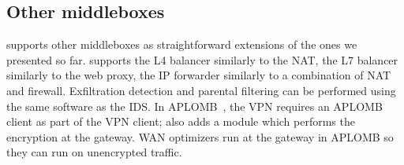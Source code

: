 
\subsection{Other middleboxes}\label{sec:vpn} \label{sec:other_apps} \label{sec:not_supp}\label{sec:loadb}

 \sys supports other middleboxes as straightforward extensions of the ones we presented so far. 
\sys supports the L4 balancer similarly to the NAT, the L7 balancer similarly to the web proxy, the IP forwarder similarly to a combination of NAT and firewall. 
Exfiltration detection and parental filtering can be performed using the same software as the IDS.
In APLOMB~\cite{aplomb}, the VPN requires an APLOMB client as part of the VPN client; \sys also adds a module  which performs the encryption at the gateway. WAN optimizers run at the gateway in APLOMB so they can run on unencrypted traffic. 



%
%
%
%
%
%
%
%
%




